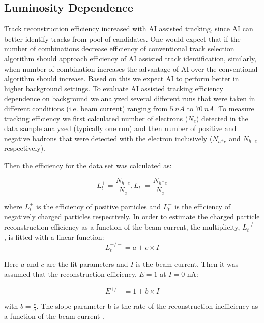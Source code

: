 \subsection{Luminosity Dependence}

Track reconstruction efficiency increased with AI assisted tracking, since AI can better identify tracks
from pool of candidates. One would expect that if the number of combinations decrease efficiency 
of conventional track selection algorithm should approach efficiency of AI assisted track identification,
similarly, when number of combination increases the advantage of AI over the conventional algorithm should
increase. Based on this we expect AI to perform better in higher background settings. To evaluate AI assisted
tracking efficiency dependence on background we analyzed several different runs that were taken in different 
conditions (i.e. beam current) ranging from $5~nA$ to $70~nA$. To measure tracking efficiency we first calculated
number of electrons ($N_e$) detected in the data sample analyzed (typically one run) and then number of positive and negative
 hadrons that were detected with the electron inclusively ($N_{h^+e}$ and $N_{h^-e}$ respectively).

Then the efficiency for the data set was calculated as:

\begin{equation}
L_t^+ = \frac{N_{h^+e}}{N_e} , L_t^- = \frac{N_{h^-e}}{N_e} 
\end{equation}

where $L_t^+$ is the efficiency of positive particles and $L_t^-$ is the efficiency of negatively charged particles respectively. 
In order to estimate the charged particle reconstruction efficiency as a function of the beam current, the multiplicity, $L_t^{+/-}$, is fitted with a linear function:
\begin{equation}
L_t^{+/-} = a + c\times I 
\end{equation}

Here $a$ and $c$ are the fit parameters and $I$ is the beam current. Then it was assumed that the reconstruction efficiency, $E=1$ at $I=0$ nA:

\begin{equation}
E^{+/-} = 1 + b \times I 
\end{equation}

with $b=\frac{c}{a}$. The slope parameter b is the rate of the reconstruction inefficiency as a function of the beam current \cite{Stepanyan:2020bg}.
 
